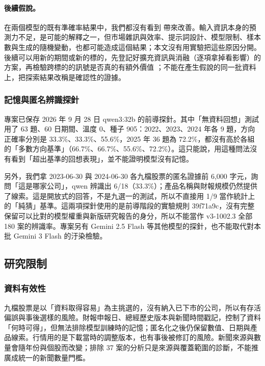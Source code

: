 \paragraph{後續假說。} 在兩個模型的既有準確率結果中，我們都沒有看到  帶來改善。輸入資訊本身的預測力不足，是可能的解釋之一，但市場雜訊與效率、提示詞設計、模型限制、樣本數與生成的隨機變動，也都可能造成這個結果；本文沒有用實驗把這些原因分開。後續可以用新的期間或新的標的，先登記好擴充資訊與消融（逐項拿掉看影響）的方案，再檢驗跨標的的訊號是否真的有額外價值 \citep{nosek2018prereg}；不能在產生假說的同一批資料上，把探索結果改稱是確認性的證據。
\subsubsection{記憶與匿名辨識探針}

專案已保存 2026 年 9 月 28 日 qwen3:32b 的前導探針。其中「無資料回想」測試用了 63 題、60 日期間、溫度 0、種子 905：2022、2023、2024 年各 9 題，方向正確率分別是 33.3\%、33.3\%、55.6\%，2025 年 36 題為 72.2\%，都沒有高於各組的「多數方向基準」（66.7\%、66.7\%、55.6\%、72.2\%）。這只能說，用這種問法沒有看到「超出基準的回想表現」，並不能證明模型沒有記憶。

另外，我們拿 2023-06-30 與 2024-06-30 各九檔股票的匿名證據前 6,000 字元，詢問「這是哪家公司」，qwen 辨識出 6/18（33.3\%）；產品名稱與財報規模仍然提供了線索。這是開放式的回答，不是九選一的測試，所以不直接用 1/9 當作統計上的「純猜」基準。這兩項探針使用的是前導階段的實驗規則 39f71a9c，沒有完整保留可以比對的模型權重與新版研究報告的身分，所以不能當作 v3-1002.3 全部 180 案的辨識率。專案另有 Gemini 2.5 Flash 等其他模型的探針，也不能取代對本批 Gemini 3 Flash 的汙染檢驗。


\subsection{研究限制}

\subsubsection{資料有效性}
九檔股票是以「資料取得容易」為主挑選的，沒有納入已下市的公司，所以有存活偏誤與事後選樣的風險。財報申報日、總經歷史版本與新聞時間戳記，控制了資料「何時可得」，但無法排除模型訓練時的記憶；匿名化之後仍保留數值、日期與產品線索。行情用的是下載當時的調整版本，也有事後被修訂的風險。新聞來源與數量會隨年份與個股而改變；排除 37 案的分析只是來源與覆蓋範圍的診斷，不能推廣成統一的新聞數量門檻。

